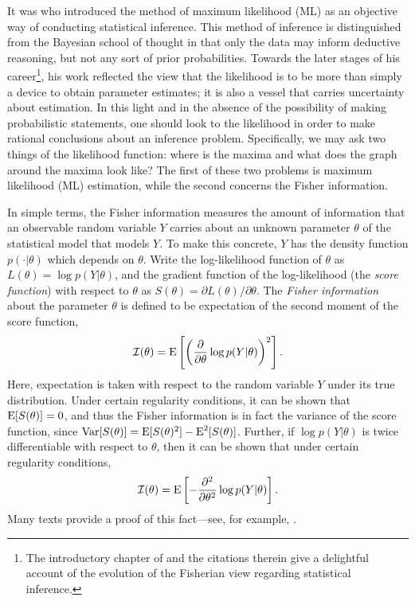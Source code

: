 It was \citet{ra1922mathematical} who introduced the method of maximum likelihood (ML) as an objective way of conducting statistical inference.
This method of inference is distinguished from the Bayesian school of thought in that only the data may inform deductive reasoning, but not any sort of  prior probabilities.
Towards the later stages of his career\footnote{The introductory chapter of \citet{pawitan2001all} and the citations therein give a delightful  account of the evolution of the Fisherian view regarding statistical inference.}, his work reflected the view that the likelihood is to be more than simply a device to obtain parameter estimates; it is also a vessel that carries uncertainty about estimation.
In this light and in the absence of the possibility of making probabilistic statements, one should look to the likelihood in order to make rational conclusions about an inference problem.
Specifically, we may ask two things of the likelihood function: where is the maxima and what does the graph around the maxima look like?
The first of these two problems is maximum likelihood (ML) estimation, while the second concerns the Fisher information.

In simple terms, the Fisher information measures the amount of information that an observable random variable $Y$ carries about an unknown parameter $\theta$ of the statistical model that models $Y$.
To make this concrete, $Y$ has the density function $p(\cdot|\theta)$ which depends on $\theta$.
Write the log-likelihood function of $\theta$ as $L(\theta) = \log p(Y|\theta)$, and the gradient function of the log-likelihood (the \emph{score function}) with respect to $\theta$ as $S(\theta) = \partial L(\theta)/\partial\theta$.
The \emph{Fisher information} about the parameter $\theta$ is defined to be expectation of the second moment of the score function, 
\[
  {\mathcal I}(\theta) = \operatorname{E}\left[\left(\frac{\partial}{\partial\theta} \log p(Y|\theta)\right)^2\right].
\]
Here, expectation is taken with respect to the random variable $Y$ under its true distribution.
Under certain regularity conditions, it can be shown that $\operatorname{E}[S(\theta)] = 0$, and thus the Fisher information is in fact the variance of the score function, since $\operatorname{Var}[S(\theta)] = \operatorname{E}[S(\theta)^2] - \operatorname{E}^2[S(\theta)]$.
Further, if $\log p(Y|\theta)$ is twice differentiable with respect to $\theta$, then it can be shown that under certain regularity conditions,
\[
  {\mathcal I}(\theta) = \operatorname{E}\left[-\frac{\partial ^ 2}{\partial\theta^2} \log p(Y|\theta)\right].
\]
Many texts provide a proof of this fact---see, for example, \citet[sec. 9.7]{wasserman2013all}.

